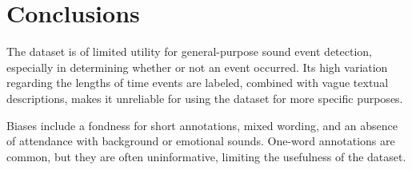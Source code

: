 \documentclass{article}
\begin{document}
\section{Conclusions} 
 The dataset is of limited utility for general-purpose sound event detection, especially in determining whether or not an event occurred. Its high variation regarding the lengths of time events are labeled, combined with vague textual descriptions, makes it unreliable for using the dataset for more specific purposes.

Biases include a fondness for short annotations, mixed wording, and an absence of attendance with background or emotional sounds. One-word annotations are common, but they are often uninformative, limiting the usefulness of the dataset.
\end{document}

